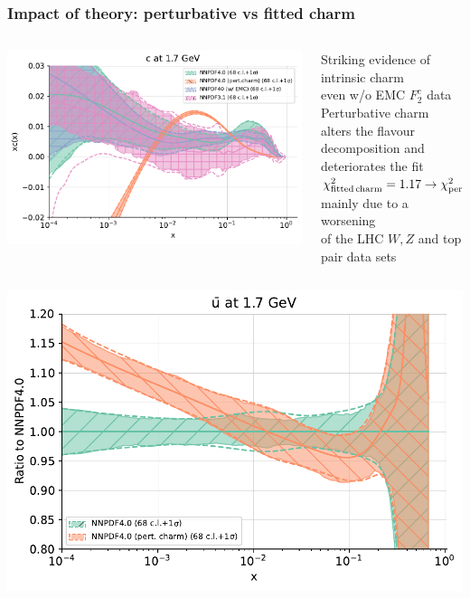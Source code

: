 \documentclass{beamer}
\begin{document}
\begin{frame}
 \frametitle{Impact of theory: perturbative vs fitted charm}
 \footnotesize
 \centering
 \begin{columns}[c]
  \begin{column}{0.5\textwidth}
   \centering
   \includegraphics[width=\columnwidth]{plots/charm_1}\\
  \end{column}
  \begin{column}{0.5\textwidth}
   \centering
   Striking evidence of intrinsic charm\\
   {\scriptsize even w/o EMC $F_2^c$ data}\\
   \vspace{0.2cm}
   Perturbative charm alters the flavour decomposition and deteriorates the fit\\
   \vspace{0.1cm}
   {\scriptsize $\chi^2_{\rm fitted\,charm}=1.17\to \chi^2_{\rm pert.\,charm}=1.19$}\\
   \vspace{0.2cm}
   {\scriptsize mainly due to a worsening\\ of the LHC $W,Z$ and top pair data sets}\\
  \end{column}
 \end{columns}
 \begin{columns}[c]
  \begin{column}{0.5\textwidth}
   \centering
   \includegraphics[width=\columnwidth]{plots/charm_2}\\

\end{column}
\end{columns}
\end{frame}
\end{document}
